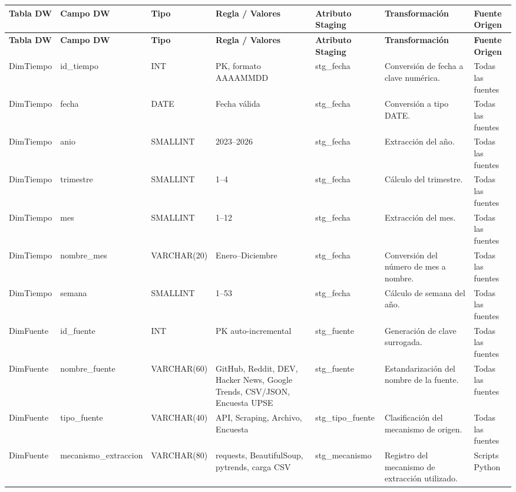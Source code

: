 \documentclass[12pt,a4paper]{article}
\renewcommand{\arraystretch}{1.25}
\begin{document}
\clearpage
{}
\begin{landscape}
\begingroup
\scriptsize
\setlength{\tabcolsep}{2.2pt}
\renewcommand{\arraystretch}{1.18}

\begin{longtable}{|P{3.55cm}|P{3.05cm}|P{2.35cm}|P{4.00cm}|P{3.95cm}|P{4.95cm}|P{3.05cm}|}
\hline
{}
\textbf{Tabla DW} & \textbf{Campo DW} & \textbf{Tipo} & \textbf{Regla / Valores} & \textbf{Atributo Staging} & \textbf{Transformación} & \textbf{Fuente Origen} \\ \hline
\endfirsthead

\hline
{}
\textbf{Tabla DW} & \textbf{Campo DW} & \textbf{Tipo} & \textbf{Regla / Valores} & \textbf{Atributo Staging} & \textbf{Transformación} & \textbf{Fuente Origen} \\ \hline
\endhead

DimTiempo & id\_tiempo & INT & PK, formato AAAAMMDD & stg\_fecha & Conversión de fecha a clave numérica. & Todas las fuentes \\ \hline
DimTiempo & fecha & DATE & Fecha válida & stg\_fecha & Conversión a tipo DATE. & Todas las fuentes \\ \hline
DimTiempo & anio & SMALLINT & 2023--2026 & stg\_fecha & Extracción del año. & Todas las fuentes \\ \hline
DimTiempo & trimestre & SMALLINT & 1--4 & stg\_fecha & Cálculo del trimestre. & Todas las fuentes \\ \hline
DimTiempo & mes & SMALLINT & 1--12 & stg\_fecha & Extracción del mes. & Todas las fuentes \\ \hline
DimTiempo & nombre\_mes & VARCHAR(20) & Enero--Diciembre & stg\_fecha & Conversión del número de mes a nombre. & Todas las fuentes \\ \hline
DimTiempo & semana & SMALLINT & 1--53 & stg\_fecha & Cálculo de semana del año. & Todas las fuentes \\ \hline

DimFuente & id\_fuente & INT & PK auto-incremental & stg\_fuente & Generación de clave surrogada. & Todas las fuentes \\ \hline
DimFuente & nombre\_fuente & VARCHAR(60) & GitHub, Reddit, DEV, Hacker News, Google Trends, CSV/JSON, Encuesta UPSE & stg\_fuente & Estandarización del nombre de la fuente. & Todas las fuentes \\ \hline
DimFuente & tipo\_fuente & VARCHAR(40) & API, Scraping, Archivo, Encuesta & stg\_tipo\_fuente & Clasificación del mecanismo de origen. & Todas las fuentes \\ \hline
DimFuente & mecanismo\_extraccion & VARCHAR(80) & requests, BeautifulSoup, pytrends, carga CSV & stg\_mecanismo & Registro del mecanismo de extracción utilizado. & Scripts Python \\ \hline


\end{longtable}
\end{landscape}
\end{document}
